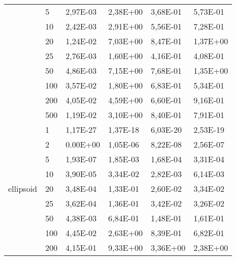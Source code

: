 \begin{longtable}[c]{|m{3.5cm}|l|l|l|l|l|}
                                        & 5         & 2,97E-03   & 2,38E+00   & 3,68E-01   & 5,73E-01  \\ \cline{2-6} 
                                        & 10        & 2,42E-03   & 2,91E+00   & 5,56E-01   & 7,28E-01  \\ \cline{2-6} 
                                        & 20        & 1,24E-02   & 7,03E+00   & 8,47E-01   & 1,37E+00  \\ \cline{2-6} 
                                        & 25        & 2,76E-03   & 1,60E+00   & 4,16E-01   & 4,08E-01  \\ \cline{2-6} 
                                        & 50        & 4,86E-03   & 7,15E+00   & 7,68E-01   & 1,35E+00  \\ \cline{2-6} 
                                        & 100       & 3,57E-02   & 1,80E+00   & 6,83E-01   & 5,34E-01  \\ \cline{2-6} 
                                        & 200       & 4,05E-02   & 4,59E+00   & 6,60E-01   & 9,16E-01  \\ \cline{2-6} 
                                        & 500       & 1,19E-02   & 3,10E+00   & 8,40E-01   & 7,91E-01  \\ \hline
\multirow{10}{*}{ellipsoid}             & 1         & 1,17E-27   & 1,37E-18   & 6,03E-20   & 2,53E-19  \\ \cline{2-6} 
                                        & 2         & 0.00E+00   & 1,05E-06   & 8,22E-08   & 2,56E-07  \\ \cline{2-6} 
                                        & 5         & 1,93E-07   & 1,85E-03   & 1,68E-04   & 3,31E-04  \\ \cline{2-6} 
                                        & 10        & 3,90E-05   & 3,34E-02   & 2,82E-03   & 6,14E-03  \\ \cline{2-6} 
                                        & 20        & 3,48E-04   & 1,33E-01   & 2,60E-02   & 3,34E-02  \\ \cline{2-6} 
                                        & 25        & 3,62E-04   & 1,36E-01   & 3,42E-02   & 3,26E-02  \\ \cline{2-6} 
                                        & 50        & 4,38E-03   & 6,84E-01   & 1,48E-01   & 1,61E-01  \\ \cline{2-6} 
                                        & 100       & 4,45E-02   & 2,63E+00   & 8,39E-01   & 6,82E-01  \\ \cline{2-6} 
                                        & 200       & 4,15E-01   & 9,33E+00   & 3,36E+00   & 2,38E+00  \\ \cline{2-6} 

\end{longtable}
